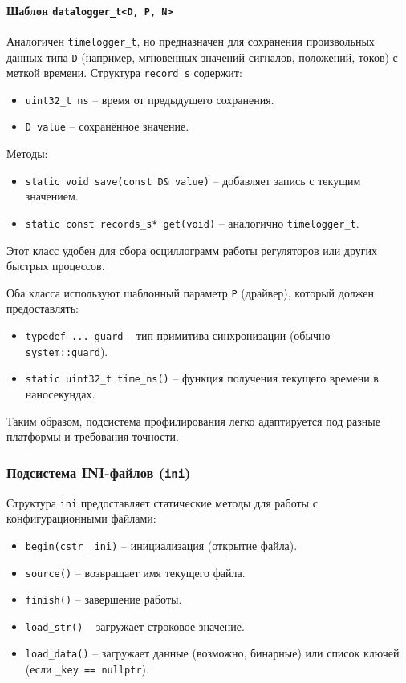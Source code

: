 \documentclass[a4paper,12pt]{article}
\begin{document}
\paragraph{Шаблон \texttt{datalogger\_t<D, P, N>}}

Аналогичен \texttt{timelogger\_t}, но предназначен для сохранения произвольных данных типа \texttt{D} (например, мгновенных значений сигналов, положений, токов) с меткой времени. Структура \texttt{record\_s} содержит:

\begin{itemize}
    \item \texttt{uint32\_t ns} -- время от предыдущего сохранения.
    \item \texttt{D value} -- сохранённое значение.
\end{itemize}

Методы:
\begin{itemize}
    \item \texttt{static void save(const D\& value)} -- добавляет запись с текущим значением.
    \item \texttt{static const records\_s* get(void)} -- аналогично \texttt{timelogger\_t}.
\end{itemize}

Этот класс удобен для сбора осциллограмм работы регуляторов или других быстрых процессов.

Оба класса используют шаблонный параметр \texttt{P} (драйвер), который должен предоставлять:
\begin{itemize}
    \item \texttt{typedef ... guard} -- тип примитива синхронизации (обычно \texttt{system::guard}).
    \item \texttt{static uint32\_t time\_ns()} -- функция получения текущего времени в наносекундах.
\end{itemize}

Таким образом, подсистема профилирования легко адаптируется под разные платформы и требования точности.

\subsubsection{Подсистема INI-файлов (\texttt{ini})}

Структура \texttt{ini} предоставляет статические методы для работы с конфигурационными файлами:
\begin{itemize}
    \item \texttt{begin(cstr \_ini)} -- инициализация (открытие файла).
    \item \texttt{source()} -- возвращает имя текущего файла.
    \item \texttt{finish()} -- завершение работы.
    \item \texttt{load\_str()} -- загружает строковое значение.
    \item \texttt{load\_data()} -- загружает данные (возможно, бинарные) или список ключей (если \texttt{\_key == nullptr}).
\end{itemize}
\end{document}

